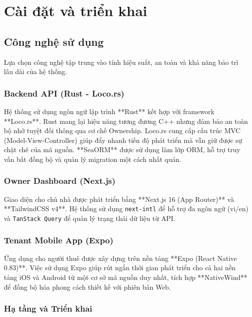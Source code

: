 \chapter{Cài đặt và triển khai}\label{chapter_impl}

\section{Công nghệ sử dụng}

Lựa chọn công nghệ tập trung vào tính hiệu suất, an toàn và khả năng bảo trì lâu dài của hệ thống.

\subsection{Backend API (Rust - Loco.rs)}

Hệ thống sử dụng ngôn ngữ lập trình **Rust** kết hợp với framework **Loco.rs**. Rust mang lại hiệu năng tương đương C++ nhưng đảm bảo an toàn bộ nhớ tuyệt đối thông qua cơ chế Ownership. Loco.rs cung cấp cấu trúc MVC (Model-View-Controller) giúp đẩy nhanh tiến độ phát triển mà vẫn giữ được sự chặt chẽ của mã nguồn. **SeaORM** được sử dụng làm lớp ORM, hỗ trợ truy vấn bất đồng bộ và quản lý migration một cách nhất quán.

\subsection{Owner Dashboard (Next.js)}

Giao diện cho chủ nhà được phát triển bằng **Next.js 16 (App Router)** và **TailwindCSS v4**. Hệ thống sử dụng \texttt{next-intl} để hỗ trợ đa ngôn ngữ (vi/en) và \texttt{TanStack Query} để quản lý trạng thái dữ liệu từ API.

\subsection{Tenant Mobile App (Expo)}

Ứng dụng cho người thuê được xây dựng trên nền tảng **Expo (React Native 0.83)**. Việc sử dụng Expo giúp rút ngắn thời gian phát triển cho cả hai nền tảng iOS và Android từ một cơ sở mã nguồn duy nhất, tích hợp **NativeWind** để đồng bộ hóa phong cách thiết kế với phiên bản Web.

\subsection{Hạ tầng và Triển khai}

